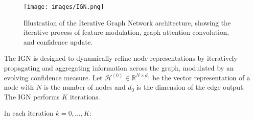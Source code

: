 \begin{figure}
  \centering
  \texttt{[image: images/IGN.png]}
  \caption{Illustration of the Iterative Graph Network architecture, showing the iterative process of feature modulation, graph attention convolution, and confidence update.}
  \label{fig:ign}
\end{figure}

The IGN is designed to dynamically refine node representations by iteratively propagating and aggregating information across the graph, modulated by an evolving confidence measure. Let \(\mathcal{H}^{(0)} \in \mathbb{R}^{N \times d_0}\) be the vector representation of a node with \(N\) is the number of nodes and \(d_0\) is the dimension of the edge output. The IGN performs \(K\) iterations.

In each iteration \(k = 0, \dots, K\):
